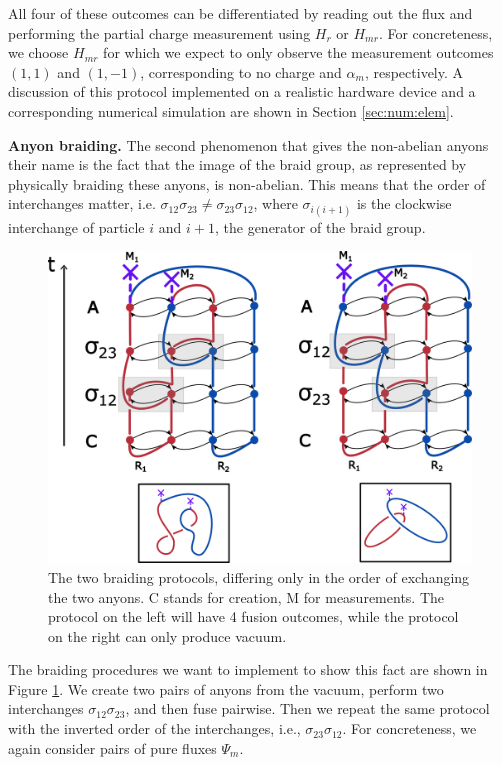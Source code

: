 \documentclass[a4paper,twocolumn,11pt, accepted=2024-06-14]{quantumarticle}
\begin{document}
All four of these outcomes can be differentiated by reading out the flux and performing the partial charge measurement using $H_r$ or $H_{mr}$. For concreteness, we choose $H_{mr}$ for which we expect to only observe the measurement outcomes $(1,1)$ and $(1,-1)$, corresponding to no charge and $\alpha_m$, respectively. A discussion of this protocol implemented on a realistic hardware device and a corresponding numerical simulation are shown in Section \ref{sec:num:elem}.



\textbf{Anyon braiding.} The second phenomenon that gives the non-abelian anyons their name is the fact that the image of the braid group, as represented by physically braiding these anyons, is non-abelian. 
This means that the order of interchanges matter, i.e. $\sigma_{12}\sigma_{23} \neq \sigma_{23}\sigma_{12}$, where $\sigma_{i(i+1)}$ is the clockwise interchange of particle $i$ and $i+1$, the generator of the braid group.


\begin{figure}
    \centering
    \includegraphics[width=\linewidth]{Figures/fluxBRAID.pdf}
    \caption{The two braiding protocols, differing only in the order of exchanging the two anyons. C stands for creation, M for measurements.  The protocol on the left will have 4 fusion outcomes, while the protocol on the right can only produce vacuum.}
    \label{fig:flux_braid}
\end{figure}

The braiding procedures we want to implement to show this fact are shown in Figure \ref{fig:flux_braid}. We create two pairs of anyons from the vacuum, perform two interchanges $\sigma_{12} \sigma_{23}$, and then fuse pairwise. Then we repeat the same protocol with the inverted order of the interchanges, i.e., $\sigma_{23} \sigma_{12}$. For concreteness, we again consider pairs of pure fluxes $\Psi_m$. 
\end{document}
